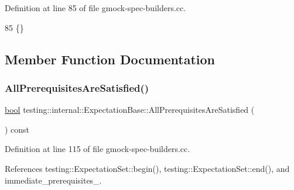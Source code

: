 Definition at line 85 of file gmock-\/spec-\/builders.\+cc.


\begin{DoxyCode}
85 \{\}
\end{DoxyCode}


\subsection{Member Function Documentation}
\mbox{\label{classtesting_1_1internal_1_1ExpectationBase_a82ba68cdd71a8b5aff5a5be24c23a637}} 
\subsubsection{\texorpdfstring{All\+Prerequisites\+Are\+Satisfied()}{AllPrerequisitesAreSatisfied()}}
{\footnotesize\ttfamily \hyperlink{classbool}{bool} testing\+::internal\+::\+Expectation\+Base\+::\+All\+Prerequisites\+Are\+Satisfied (\begin{DoxyParamCaption}{ }\end{DoxyParamCaption}) const\hspace{0.3cm}{\ttfamily [protected]}}



Definition at line 115 of file gmock-\/spec-\/builders.\+cc.



References testing\+::\+Expectation\+Set\+::begin(), testing\+::\+Expectation\+Set\+::end(), and immediate\+\_\+prerequisites\+\_\+.


